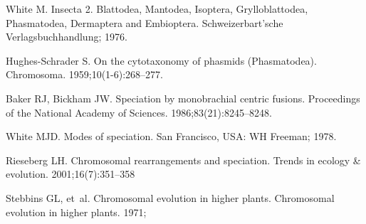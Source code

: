 \documentclass[]{rsos}%
\begin{document}
\begin{thebibliography}{99}
White M.
\newblock Insecta 2. Blattodea, Mantodea, Isoptera, Grylloblattodea,
  Phasmatodea, Dermaptera and Embioptera.
\newblock Schweizerbart'sche Verlagsbuchhandlung; 1976.

Hughes-Schrader S.
 On the cytotaxonomy of phasmids (Phasmatodea).
 Chromosoma. 1959;10(1-6):268--277.

Baker RJ, Bickham JW.
 Speciation by monobrachial centric fusions.
 Proceedings of the National Academy of Sciences.
  1986;83(21):8245--8248.

White MJD.
 Modes of speciation.
 San Francisco, USA: WH Freeman; 1978.
 
Rieseberg LH.
Chromosomal rearrangements and speciation.
Trends in ecology \& evolution. 2001;16(7):351--358

Stebbins GL, et~al.
 Chromosomal evolution in higher plants.
 Chromosomal evolution in higher plants. 1971;

\end{thebibliography}
\end{document}

